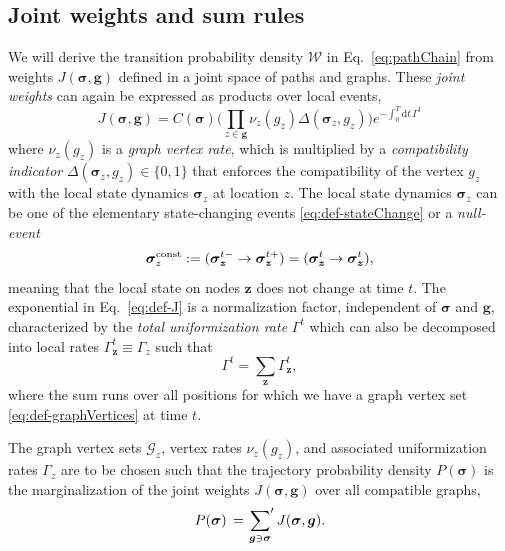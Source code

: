 \documentclass[english,10pt,aps,pra,twocolumn,superscriptaddress,floatfix,fleqn]{revtex4-2}
\newcommand{\ud}{\mathrm{d}}
\newcommand{\mc}[1]{\mathcal{#1}}
\renewcommand{\vec}[1]{{\boldsymbol{#1}}}
\newcommand{\G} {\mc{G}}
\newcommand{\W} {\mc{W}}
\newcommand{\vg}{\vec{g}}
\newcommand{\vs}{\vec{\sigma}}
\newcommand{\vz}{\vec{z}}
\newcommand{\sump}{\sideset{}{'}\sum}
\newcommand{\const}{\textnormal{const}}
\begin{document}
\subsection{Joint weights and sum rules}
We will derive the transition probability density $\W$ in Eq.~\eqref{eq:pathChain} from weights $J(\vs,\vg)$ defined in a joint space of paths and graphs. These \emph{joint weights} can again be expressed as products over local events,
\begin{equation}\label{eq:def-J}
	J(\vs,\vg)=C(\vs) \Big(\prod_{z\in\vg}\nu_z(g_z)\Delta(\vs_z,g_z) \Big)e^{-\int_0^T\ud t\,\Gamma^t}
\end{equation}
where $\nu_z(g_z)$ is a \emph{graph vertex rate}, which is multiplied by a \emph{compatibility indicator} $\Delta(\vs_z, g_z) \in \{0,1\}$ that enforces the compatibility of the vertex $g_z$ with the local state dynamics $\vs_z$ at location $z$. The local state dynamics $\vs_z$ can be one of the elementary state-changing events \eqref{eq:def-stateChange} or a \emph{null-event}
\begin{equation}\label{eq:def-nonEvent}
	\vs_z^{\const}:=(\vs_\vz^{t-}\to\vs_\vz^{t+})=(\vs_\vz^t\to \vs_\vz^t),
\end{equation}
meaning that the local state on nodes $\vz$ does not change at time $t$.
The exponential in Eq.~\eqref{eq:def-J} is a normalization factor, independent of $\vs$ and $\vg$, characterized by the \emph{total uniformization rate} $\Gamma^t$ which can also be decomposed into local rates $\Gamma_\vz^t\equiv \Gamma_z$ such that
\begin{equation}\label{eq:def-Gamma-total}
	\Gamma^t=\sum_\vz \Gamma_\vz^t,
\end{equation}
where the sum runs over all positions for which we have a graph vertex set \eqref{eq:def-graphVertices} at time $t$.

The graph vertex sets $\G_z$, vertex rates $\nu_z(g_z)$, and associated uniformization rates $\Gamma_z$ are to be chosen such that the trajectory probability density $P(\vs)$ is the marginalization of the joint weights $J(\vs,\vg)$ over all compatible graphs,
\begin{equation}\label{eq:Jmargin-g}
	P(\vs) \,= \sump_{\vg\ni\vs} J(\vs,\vg).
\end{equation}
\end{document}

